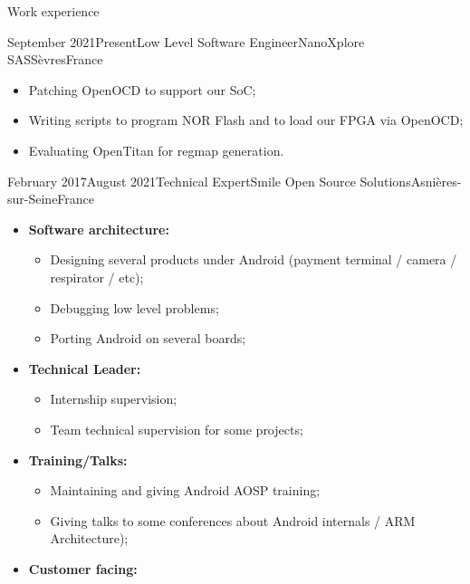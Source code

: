 \documentclass[a4paper, 10pt]{article}
\begin{document}
\begin{section} {Work experience}
\begin{experience}{September 2021}{Present}{Low Level Software Engineer}{NanoXplore SAS}{S\`{e}vres}{France}
\begin{subexperience}
\begin{itemize}[parsep=0cm,itemsep=0cm,topsep=0cm]
				\begin{itemize}[parsep=0cm,itemsep=0cm,topsep=0cm]
					\item Patching OpenOCD to support our SoC;
					\item Writing scripts to program NOR Flash and to load our FPGA via OpenOCD;
					\item Evaluating OpenTitan for regmap generation.
				\end{itemize}
		\end{itemize}
	\end{subexperience}
	\end{experience}

    \begin{experience}{February 2017}{August 2021}{Technical Expert}{Smile Open Source Solutions}{Asni\`{e}res-sur-Seine}{France}
    \begin{subexperience}
    \begin{itemize}[parsep=0cm,itemsep=0cm,topsep=0cm]
		\item \textbf {Software architecture:}
		\begin{itemize}[parsep=0cm,itemsep=0cm,topsep=0cm]
			\item Designing several products under Android (payment terminal / camera / respirator / etc);
			\item Debugging low level problems;
			\item Porting Android on several boards;
		\end{itemize}
		\item \textbf {Technical Leader:}
		\begin{itemize}[parsep=0cm,itemsep=0cm,topsep=0cm]
			\item Internship supervision;
			\item Team technical supervision for some projects;
		\end{itemize}
		\item \textbf {Training/Talks:}
		\begin{itemize}[parsep=0cm,itemsep=0cm,topsep=0cm]
			\item Maintaining and giving Android AOSP training;
			\item Giving talks to some conferences about Android internals / ARM Architecture);
		\end{itemize}
		\item \textbf {Customer facing:}
		\begin{itemize}[parsep=0cm,itemsep=0cm,topsep=0cm]

\end{itemize}
\end{itemize}
\end{subexperience}
\end{experience}
\end{section}
\end{document}
